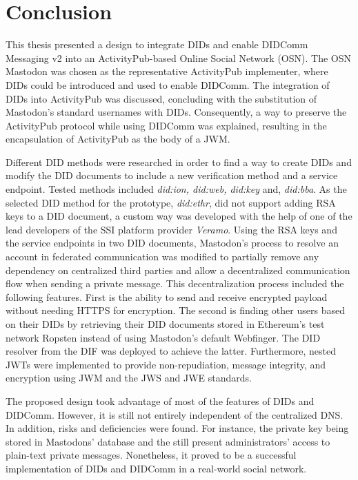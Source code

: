 \chapter{Conclusion}
\label{cha:conclusion}

This thesis presented a design to integrate DIDs and enable DIDComm Messaging v2 into an ActivityPub-based Online Social Network (OSN). The OSN Mastodon was chosen as the representative ActivityPub implementer, where DIDs could be introduced and used to enable DIDComm. 
 The integration of DIDs into ActivityPub was discussed, concluding with the substitution of Mastodon's standard usernames with DIDs. Consequently, a way to preserve the ActivityPub protocol while using DIDComm was explained, resulting in the encapsulation of ActivityPub as the body of a JWM.

Different DID methods were researched in order to find a way to create DIDs and modify the DID documents to include a new verification method and a service endpoint. Tested methods included \emph{did:ion, did:web, did:key} and, \emph{did:bba}. As the selected DID method for the prototype, \emph{did:ethr}, did not support adding RSA keys to a DID document, a custom way was developed with the help of one of the lead developers of the SSI platform provider \emph{Veramo}.
Using the RSA keys and the service endpoints in two DID documents, Mastodon's process to resolve an account in federated communication was modified to partially remove any dependency on centralized third parties and allow a decentralized communication flow when sending a private message. This decentralization process included the following features. First is the ability to send and receive encrypted payload without needing HTTPS for encryption. The second is finding other users based on their DIDs by retrieving their DID documents stored in Ethereum's test network Ropsten instead of using Mastodon's default Webfinger. The DID resolver from the DIF was deployed to achieve the latter. Furthermore, nested JWTs were implemented to provide non-repudiation, message integrity, and encryption using JWM and the JWS and JWE standards.

The proposed design took advantage of most of the features of DIDs and DIDComm. However, it is still not entirely independent of the centralized DNS. In addition, risks and deficiencies were found. For instance, the private key being stored in Mastodons' database and the still present administrators' access to plain-text private messages. Nonetheless, it proved to be a successful implementation of DIDs and DIDComm in a real-world social network. 



